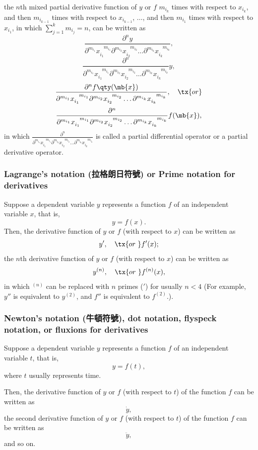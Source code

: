 the $n$th mixed partial derivative function of $y$ or $f$ $m_{i_k}$ times with respect to $x_{i_k}$, and then $m_{i_{k-1}}$ times with respect to $x_{i_{k-1}}$, $\ldots$, and then $m_{i_1}$ times with respect to $x_{i_1}$, in which $\sum_{j=1}^km_{i_j}=n$, can be written as
\[\frac{\partial^ny}{\partial^{m_{i_1}}x_{i_1}^{\phantom{i_1}m_{i_1}}\partial^{m_{i_2}}x_{i_2}^{\phantom{i_2}m_{i_2}}\dots \partial^{m_{i_k}}x_{i_k}^{\phantom{i_k}m_{i_k}}},\]
\[\frac{\partial^n}{\partial^{m_{i_1}}x_{i_1}^{\phantom{i_1}m_{i_1}}\partial^{m_{i_2}}x_{i_2}^{\phantom{i_2}m_{i_2}}\dots \partial^{m_{i_k}}x_{i_k}^{\phantom{i_k}m_{i_k}}}y,\]
\[\frac{\partial^nf\qty(\mb{x})}{\partial^{m_{i_1}}x_{i_1}^{\phantom{i_1}m_{i_1}}\partial^{m_{i_2}}x_{i_2}^{\phantom{i_2}m_{i_2}}\dots \partial^{m_{i_k}}x_{i_k}^{\phantom{i_k}m_{i_k}}},\quad \tx{or}\]
\[\frac{\partial^n}{\partial^{m_{i_1}}x_{i_1}^{\phantom{i_1}m_{i_1}}\partial^{m_{i_2}}x_{i_2}^{\phantom{i_2}m_{i_2}}\dots \partial^{m_{i_k}}x_{i_k}^{\phantom{i_k}m_{i_k}}}f(\mb{x}),\]
in which $\frac{\partial^n}{\partial^{m_{i_1}}x_{i_1}^{\phantom{i_1}m_{i_1}}\partial^{m_{i_2}}x_{i_2}^{\phantom{i_2}m_{i_2}}\dots \partial^{m_{i_k}}x_{i_k}^{\phantom{i_k}m_{i_k}}}$ is called a partial differential operator or a partial derivative operator.
\subsubsection{Lagrange's notation (拉格朗日符號) or Prime notation for derivatives}
Suppose a dependent variable $y$ represents a function $f$ of an independent variable $x$, that is,
\[y=f(x).\]
Then, the derivative function of $y$ or $f$ (with respect to $x$) can be written as
\[y',\quad\tx{or\ }f'(x);\]
the $n$th derivative function of $y$ or $f$ (with respect to $x$) can be written as
\[y^{(n)},\quad\tx{or\ }f^{(n)}(x),\]
in which $^{(n)}$ can be replaced with $n$ primes ($'$) for usually $n<4$ (For example, $y''$ is equivalent to $y^{(2)}$, and $f''$ is equivalent to $f^{(2)}$.).
\subsubsection{Newton's notation (牛頓符號), dot notation, flyspeck notation, or fluxions for derivatives}
Suppose a dependent variable $y$ represents a function $f$ of an independent variable $t$, that is,
\[y=f(t),\]
where $t$ usually represents time.

Then, the derivative function of $y$ or $f$ (with respect to $t$) of the function $f$ can be written as
\[\dot{y},\]
the second derivative function of $y$ or $f$ (with respect to $t$) of the function $f$ can be written as
\[\ddot{y},\]
and so on.
